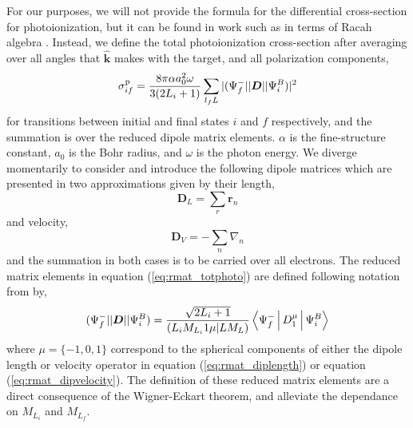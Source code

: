 For our purposes, we will not provide the formula for the differential cross-section for photoionization, but it can be found in work such as \citet{1975JPhB....8.2620B} in terms of Racah algebra \citep{1959its..book.....F}. Instead, we define the total photoionization cross-section after averaging over all angles that $\boldsymbol{\hat{k}}$ makes with the target, and all polarization components,
\begin{equation}\label{eq:rmat_totphoto}
\sigma^{{\rm p}}_{if} = \frac{8\pi\alpha a_0^2\omega}{3(2L_i+1)}\sum_{l_fL}|(\Psi_f^- || \boldsymbol{D} || \Psi_i^B)|^2
\end{equation}
for transitions between initial and final states $i$ and $f$ respectively, and the summation is over the reduced dipole matrix elements. $\alpha$ is the fine-structure constant, $a_0$ is the Bohr radius, and $\omega$ is the photon energy. We diverge momentarily to consider and introduce the following dipole matrices which are presented in two approximations given by their length,
\begin{equation}\label{eq:rmat_diplength}
\boldsymbol{D}_L=\sum_r\boldsymbol{r}_n
\end{equation}
and velocity,
\begin{equation}\label{eq:rmat_dipvelocity}
\boldsymbol{D}_V=-\sum_n\nabla_n
\end{equation}
and the summation in both cases is to be carried over all electrons. The reduced matrix elements in equation (\ref{eq:rmat_totphoto}) are defined following notation from \citet{1959its..book.....F} by,
\begin{equation}\label{eq:rmat_reducedmatrix}
(\Psi_f^- || \boldsymbol{D} || \Psi_i^B)=\frac{\sqrt{2L_i+1}}{(L_iM_{L_i}1\mu | LM_L)}\Braket{\Psi_f^-|D_1^\mu|\Psi_i^B}
\end{equation}
where $\mu = \{-1,0,1\}$ correspond to the spherical components of either the dipole length or velocity operator in equation (\ref{eq:rmat_diplength}) or equation (\ref{eq:rmat_dipvelocity}). The definition of these reduced matrix elements are a direct consequence of the Wigner-Eckart theorem, and alleviate the dependance on $M_{L_i}$ and $M_{L_f}$. 

